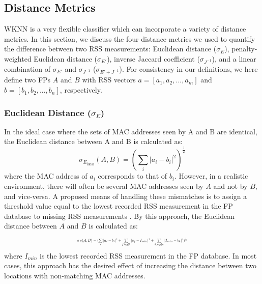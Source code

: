 \documentclass[conference]{IEEEtran}
\begin{document}
\subsection{Distance Metrics}\label{subsec:distance_metrics}
WKNN is a very flexible classifier which can incorporate a variety of distance metrics. In this section, we discuss the four distance metrics we used to quantify the difference between two RSS measurements: Euclidean distance ($\sigma_E$), penalty-weighted Euclidean distance ($\sigma_{E'}$), inverse Jaccard coefficient ($\sigma_{J^{-1}}$), and a linear combination of $\sigma_{E'}$ and $\sigma_{J^{-1}}$ ($\sigma_{E' + J^{-1}}$). For consistency in our definitions, we here define two FPs $A$ and $B$ with RSS vectors $a=[a_1, a_2, ... , a_m]$ and $b=[b_1, b_2, ... , b_n]$, respectively. 

\subsubsection{Euclidean Distance ($\sigma_E$)}

\indent In the ideal case where the sets of MAC addresses seen by A and B are identical, the Euclidean distance between A and B is calculated as:
\begin{equation}
\label{eq:euclidean_ideal}
\sigma_{E_{\text{ideal}}}(A, B) = (\sum\limits_{i}|a_i - b_i|^2)^\frac{1}{2}
\end{equation}
where the MAC address of $a_i$ corresponds to that of $b_i$. However, in a realistic environment, there will often be several MAC addresses seen by $A$ and not by $B$, and vice-versa. A proposed means of handling these mismatches is to assign a threshold value equal to the lowest recorded RSS measurement in the FP database to missing RSS measurements \cite{Kemppi}. By this approach, the Euclidean distance between $A$ and $B$ is calculated as:
\begin{equation}
\label{eq:euclidean}
\resizebox{0.45\textwidth}{!}{$\sigma_{E}(A, B)=(\sum\limits_{i}|a_i-b_i|^2+\sum\limits_{j, b_j\notin b}|a_j-I_{min}|^2+\sum\limits_{k, a_j\notin a}|I_{min}-b_k|^2)^\frac{1}{2}$}
\end{equation}
where $I_{min}$ is the lowest recorded RSS measurement in the FP database. In most cases, this approach has the desired effect of increasing the distance between two locations with non-matching MAC addresses.
\end{document}
